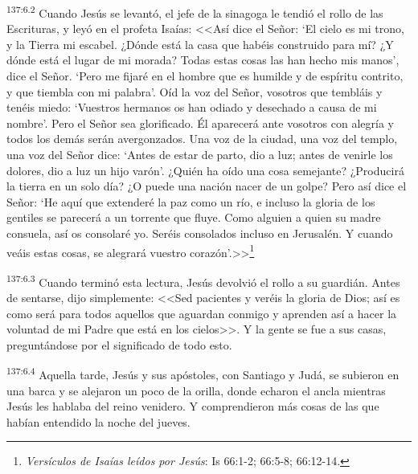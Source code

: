 \par 
\textsuperscript{137:6.2} Cuando Jesús se levantó, el jefe de la sinagoga le tendió el rollo de las Escrituras, y leyó en el profeta Isaías: <<Así dice el Señor: `El cielo es mi trono, y la Tierra mi escabel. ¿Dónde está la casa que habéis construido para mí? ¿Y dónde está el lugar de mi morada? Todas estas cosas las han hecho mis manos', dice el Señor. `Pero me fijaré en el hombre que es humilde y de espíritu contrito, y que tiembla con mi palabra'. Oíd la voz del Señor, vosotros que tembláis y tenéis miedo: `Vuestros hermanos os han odiado y desechado a causa de mi nombre'. Pero el Señor sea glorificado. Él aparecerá ante vosotros con alegría y todos los demás serán avergonzados. Una voz de la ciudad, una voz del templo, una voz del Señor dice: `Antes de estar de parto, dio a luz; antes de venirle los dolores, dio a luz un hijo varón'. ¿Quién ha oído una cosa semejante? ¿Producirá la tierra en un solo día? ¿O puede una nación nacer de un golpe? Pero así dice el Señor: `He aquí que extenderé la paz como un río, e incluso la gloria de los gentiles se parecerá a un torrente que fluye. Como alguien a quien su madre consuela, así os consolaré yo. Seréis consolados incluso en Jerusalén. Y cuando veáis estas cosas, se alegrará vuestro corazón'.>>\footnote{\textit{Versículos de Isaías leídos por Jesús}: Is 66:1-2; 66:5-8; 66:12-14.}

\par 
\textsuperscript{137:6.3} Cuando terminó esta lectura, Jesús devolvió el rollo a su guardián. Antes de sentarse, dijo simplemente: <<Sed pacientes y veréis la gloria de Dios; así es como será para todos aquellos que aguardan conmigo y aprenden así a hacer la voluntad de mi Padre que está en los cielos>>. Y la gente se fue a sus casas, preguntándose por el significado de todo esto.

\par 
\textsuperscript{137:6.4} Aquella tarde, Jesús y sus apóstoles, con Santiago y Judá, se subieron en una barca y se alejaron un poco de la orilla, donde echaron el ancla mientras Jesús les hablaba del reino venidero. Y comprendieron más cosas de las que habían entendido la noche del jueves.

